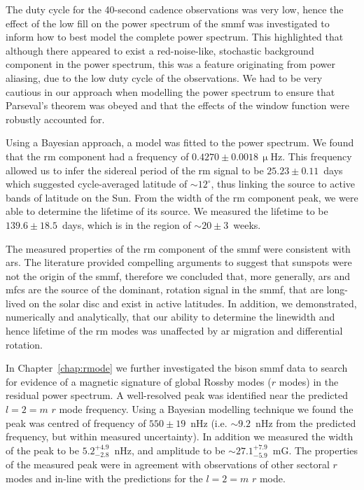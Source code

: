 The duty cycle for the 40-second cadence observations was very low, hence the effect of the low fill on the power spectrum of the \gls{smmf} was investigated to inform how to best model the complete power spectrum. This highlighted that although there appeared to exist a red-noise-like, stochastic background component in the power spectrum, this was a feature originating from power aliasing, due to the low duty cycle of the observations. We had to be very cautious in our approach when modelling the power spectrum to ensure that Parseval's theorem was obeyed and that the effects of the window function were robustly accounted for.

Using a Bayesian approach, a model was fitted to the power spectrum. We found that the \gls{rm} component had a frequency of $0.4270\pm0.0018\,\upmu\mathrm{Hz}$. This frequency allowed us to infer the sidereal period of the \gls{rm} signal to be $25.23\pm0.11$~days which suggested cycle-averaged latitude of $\sim 12^{\circ}$, thus linking the source to active bands of latitude on the Sun. From the width of the \gls{rm} component peak, we were able to determine the lifetime of its source. We measured the lifetime to be $139.6\pm18.5$~days, which is in the region of $\sim20\pm3$~weeks.

The measured properties of the \gls{rm} component of the \gls{smmf} were consistent with \glspl{ar}. The literature provided compelling arguments to suggest that sunspots were not the origin of the \gls{smmf}, therefore we concluded that, more generally, \glspl{ar} and \glspl{mfc} are the source of the dominant, rotation signal in the \gls{smmf}, that are long-lived on the solar disc and exist in active latitudes. In addition, we demonstrated, numerically and analytically, that our ability to determine the linewidth and hence lifetime of the \gls{rm} modes was unaffected by \gls{ar} migration and differential rotation.


In Chapter~\ref{chap:rmode} we further investigated the \gls{bison} \gls{smmf} data to search for evidence of a magnetic signature of global Rossby modes ($r$ modes) in the residual power spectrum. A well-resolved peak was identified near the predicted $l=2=m$ $r$ mode frequency. Using a Bayesian modelling technique we found the peak was centred of frequency of $550\pm19$~nHz (i.e. $\sim9.2$~nHz from the predicted frequency, but within measured uncertainty). In addition we measured the width of the peak to be $5.2^{+4.9}_{-2.8}$~nHz, and amplitude to be $\sim 27.1^{+7.9}_{-5.9}$~mG. The properties of the measured peak were in agreement with observations of other sectoral $r$ modes and in-line with the predictions for the $l=2=m$ $r$ mode.

